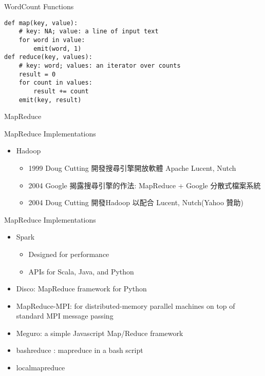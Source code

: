 \documentclass[12pt,c]{beamer}
\begin{document}
\begin{frame}[containsverbatim]{WordCount Functions}
\begin{verbatim}
def map(key, value):
    # key: NA; value: a line of input text
    for word in value:
        emit(word, 1)
def reduce(key, values):
    # key: word; values: an iterator over counts
    result = 0
    for count in values:
        result += count
    emit(key, result)
\end{verbatim}
\end{frame}

\begin{frame}{MapReduce}
\end{frame}

\begin{frame}{MapReduce Implementations}
\begin{itemize}
\item Hadoop
  \begin{itemize}
  \item 1999 Doug Cutting 開發搜尋引擎開放軟體 Apache Lucent, Nutch
  \item 2004 Google 揭露搜尋引擎的作法: MapReduce + Google 分散式檔案系統
  \item 2004 Doug Cutting 開發Hadoop 以配合 Lucent, Nutch(Yahoo 贊助)
  \end{itemize}
\end{itemize}
\end{frame}


\begin{frame}{MapReduce Implementations}
  \begin{itemize}

\item Spark
  \begin{itemize}
  \item Designed for performance
  \item APIs for Scala, Java, and Python
  \end{itemize}
\item Disco: MapReduce framework for Python
\item MapReduce-MPI: for distributed-memory parallel machines on top of standard MPI message passing
\item Meguro: a simple Javascript Map/Reduce framework
\item bashreduce : mapreduce in a bash script
\item localmapreduce
\end{itemize}

\end{frame}
\end{document}
